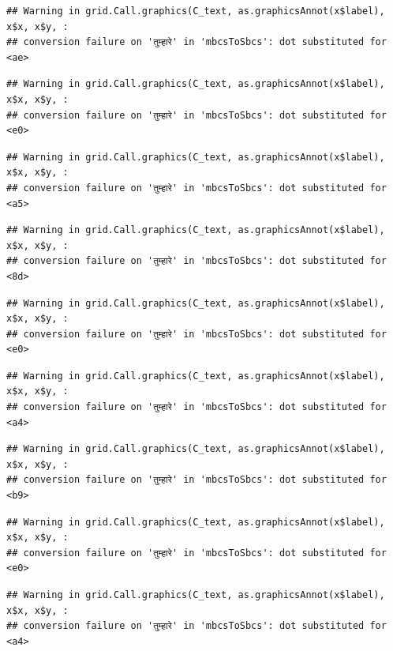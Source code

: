 \documentclass[
]{article}
\begin{document}
\begin{verbatim}
## Warning in grid.Call.graphics(C_text, as.graphicsAnnot(x$label), x$x, x$y, :
## conversion failure on 'तुम्हारे' in 'mbcsToSbcs': dot substituted for <ae>
\end{verbatim}

\begin{verbatim}
## Warning in grid.Call.graphics(C_text, as.graphicsAnnot(x$label), x$x, x$y, :
## conversion failure on 'तुम्हारे' in 'mbcsToSbcs': dot substituted for <e0>
\end{verbatim}

\begin{verbatim}
## Warning in grid.Call.graphics(C_text, as.graphicsAnnot(x$label), x$x, x$y, :
## conversion failure on 'तुम्हारे' in 'mbcsToSbcs': dot substituted for <a5>
\end{verbatim}

\begin{verbatim}
## Warning in grid.Call.graphics(C_text, as.graphicsAnnot(x$label), x$x, x$y, :
## conversion failure on 'तुम्हारे' in 'mbcsToSbcs': dot substituted for <8d>
\end{verbatim}

\begin{verbatim}
## Warning in grid.Call.graphics(C_text, as.graphicsAnnot(x$label), x$x, x$y, :
## conversion failure on 'तुम्हारे' in 'mbcsToSbcs': dot substituted for <e0>
\end{verbatim}

\begin{verbatim}
## Warning in grid.Call.graphics(C_text, as.graphicsAnnot(x$label), x$x, x$y, :
## conversion failure on 'तुम्हारे' in 'mbcsToSbcs': dot substituted for <a4>
\end{verbatim}

\begin{verbatim}
## Warning in grid.Call.graphics(C_text, as.graphicsAnnot(x$label), x$x, x$y, :
## conversion failure on 'तुम्हारे' in 'mbcsToSbcs': dot substituted for <b9>
\end{verbatim}

\begin{verbatim}
## Warning in grid.Call.graphics(C_text, as.graphicsAnnot(x$label), x$x, x$y, :
## conversion failure on 'तुम्हारे' in 'mbcsToSbcs': dot substituted for <e0>
\end{verbatim}

\begin{verbatim}
## Warning in grid.Call.graphics(C_text, as.graphicsAnnot(x$label), x$x, x$y, :
## conversion failure on 'तुम्हारे' in 'mbcsToSbcs': dot substituted for <a4>
\end{verbatim}
\end{document}
